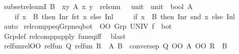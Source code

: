 \begin{isabellebody}
\endisatagproof
{\isafoldproof}%
%
\isadelimproof
\isanewline
%
\endisadelimproof
\isanewline
{}\isamarkupfalse%
\ subset{\isacharunderscore}{\kern0pt}rel{\isacharunderscore}{\kern0pt}sumI{\isacharcolon}{\kern0pt}\ {\isachardoublequoteopen}B\ {\isasymsubseteq}\ {\isacharbraceleft}{\kern0pt}{\isacharparenleft}{\kern0pt}x{\isacharcomma}{\kern0pt}y{\isacharparenright}{\kern0pt}{\isachardot}{\kern0pt}\ A\ x\ y{\isacharbraceright}{\kern0pt}\ {\isasymLongrightarrow}\ rel{\isacharunderscore}{\kern0pt}sum\ {\isacharparenleft}{\kern0pt}{\isacharparenleft}{\kern0pt}{\isacharequal}{\kern0pt}{\isacharparenright}{\kern0pt}\ {\isacharcolon}{\kern0pt}{\isacharcolon}{\kern0pt}\ unit\ {\isacharequal}{\kern0pt}{\isachargreater}{\kern0pt}\ unit\ {\isacharequal}{\kern0pt}{\isachargreater}{\kern0pt}\ bool{\isacharparenright}{\kern0pt}\ A\isanewline
\ \ \ \ {\isacharparenleft}{\kern0pt}if\ x\ {\isasymin}\ B\ then\ Inr\ {\isacharparenleft}{\kern0pt}fst\ x{\isacharparenright}{\kern0pt}\ else\ Inl\ {\isacharparenleft}{\kern0pt}{\isacharparenright}{\kern0pt}{\isacharparenright}{\kern0pt}\isanewline
\ \ \ \ {\isacharparenleft}{\kern0pt}if\ x\ {\isasymin}\ B\ then\ Inr\ {\isacharparenleft}{\kern0pt}snd\ x{\isacharparenright}{\kern0pt}\ else\ Inl\ {\isacharparenleft}{\kern0pt}{\isacharparenright}{\kern0pt}{\isacharparenright}{\kern0pt}{\isachardoublequoteclose}\isanewline
%
\isadelimproof
\ \ %
\endisadelimproof
%
\isatagproof
{}\isamarkupfalse%
\ auto%
\endisatagproof
{\isafoldproof}%
%
\isadelimproof
\isanewline
%
\endisadelimproof
\isanewline
{}\isamarkupfalse%
\ relcompp{\isacharunderscore}{\kern0pt}eq{\isacharunderscore}{\kern0pt}Grp{\isacharunderscore}{\kern0pt}neq{\isacharunderscore}{\kern0pt}bot{\isacharcolon}{\kern0pt}\ {\isachardoublequoteopen}{\isacharparenleft}{\kern0pt}{\isacharequal}{\kern0pt}{\isacharparenright}{\kern0pt}\ OO\ {\isacharparenleft}{\kern0pt}Grp\ UNIV\ f{\isacharparenright}{\kern0pt}{\isasyminverse}{\isasyminverse}\ {\isasymnoteq}\ bot{\isachardoublequoteclose}\isanewline
%
\isadelimproof
\ \ %
\endisadelimproof
%
\isatagproof
{}\isamarkupfalse%
\ Grp{\isacharunderscore}{\kern0pt}def\ relcompp{\isacharunderscore}{\kern0pt}apply\ fun{\isacharunderscore}{\kern0pt}eq{\isacharunderscore}{\kern0pt}iff\ \isamarkupfalse%
\ blast%
\endisatagproof
{\isafoldproof}%
%
\isadelimproof
\isanewline
%
\endisadelimproof
\isanewline
{}\isamarkupfalse%
\ rel{\isacharunderscore}{\kern0pt}fun{\isacharunderscore}{\kern0pt}rel{\isacharunderscore}{\kern0pt}OO{}{\isacharcolon}{\kern0pt}\ {\isachardoublequoteopen}{\isacharparenleft}{\kern0pt}rel{\isacharunderscore}{\kern0pt}fun\ Q\ {\isacharparenleft}{\kern0pt}rel{\isacharunderscore}{\kern0pt}fun\ R\ {\isacharparenleft}{\kern0pt}{\isacharequal}{\kern0pt}{\isacharparenright}{\kern0pt}{\isacharparenright}{\kern0pt}{\isacharparenright}{\kern0pt}\ A\ B\ {\isasymLongrightarrow}\ conversep\ Q\ OO\ A\ OO\ R\ {\isasymle}\ B{\isachardoublequoteclose}\isanewline

\end{isabellebody}
